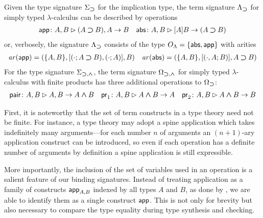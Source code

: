 \begin{example} \label{ex:STLC-sig}
  Given the type signature $\Sigma_{\mathbin{\bm{\supset}}}$ for the implication type, the term signature $\Lambda_{\mathbin{\bm{\supset}}}$ for simply typed $\lambda$-calculus can be described by operations
  \begin{align*}
    \mathsf{app}\colon A, B \rhd (A \mathbin{\bm{\supset}} B), A \to B && \mathsf{abs}\colon A , B \rhd [A]B \to (A \mathbin{\bm{\supset}} B)
  \end{align*}
  or, verbosely, the signature $\Lambda_{\mathbin{\bm{\supset}}}$ consists of the type $O_\Lambda = \{\mathsf{abs}, \mathsf{app}\}$ with arities
  \begin{align*}
    \mathit{ar}(\mathsf{app}) = (\{A, B\}, [(\cdot; A \mathbin{\bm{\supset}} B), (\cdot; A)], B)
    && 
    \mathit{ar}(\mathsf{abs}) = (\{A, B\}, [(\cdot, A; B)], A \mathbin{\bm{\supset}} B)
  \end{align*}
  For the type signature $\Sigma_{\mathbin{\bm{\supset}}, \mathbin{\bm{\wedge}}}$, the term signature $\Omega_{\mathbin{\bm{\supset}}, \mathbin{\bm{\wedge}}}$ for simply typed $\lambda$-calculus with finite products has three additional operations
to $\Omega_{\mathbin{\bm{\supset}}}$:
  \begin{align*}
    \mathsf{pair}\colon A, B \rhd A, B \to A \mathbin{\bm{\wedge}} B
    && \mathsf{pr}_{1} \colon A, B \rhd A \mathbin{\bm{\wedge}} B \to A
    && \mathsf{pr}_{2} \colon A, B \rhd A \mathbin{\bm{\wedge}} B \to B
  \end{align*}
\end{example}

First, it is noteworthy that the set of term constructs in a type theory need not be finite.
For instance, a type theory may adopt a spine application which takes indefinitely many arguments---for each number $n$ of arguments an $(n+1)$-ary application construct can be introduced, so even if each operation has a definite number of arguments by definition a spine application is still expressible.

More importantly, the inclusion of the set of variables used in an operation is a salient feature of our binding signatures.
Instead of treating application as a family of constructs $\mathsf{app}_{A, B}$ indexed by all types $A$ and $B$, as done by \citet{Fiore2022}, we are able to identify them as a single construct $\mathsf{app}$.
This is not only for brevity but also necessary to compare the type equality during type synthesis and checking.

